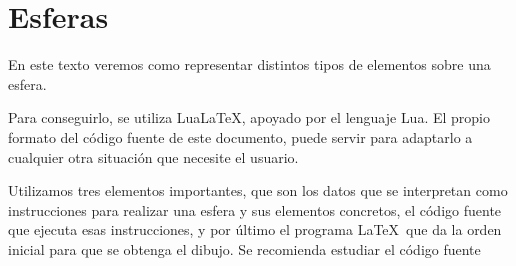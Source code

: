 %

\chapter{Esferas}

En este texto veremos como representar distintos tipos de elementos sobre una esfera.

Para conseguirlo, se utiliza Lua\LaTeX , apoyado por el lenguaje \textsf{Lua}.
El propio formato del código fuente de este documento, puede servir para adaptarlo a
cualquier otra situación que necesite el usuario.

Utilizamos tres elementos importantes, que son los datos que se interpretan como
instrucciones para realizar una esfera y sus elementos concretos, el código fuente que
ejecuta esas instrucciones, y por último el programa \LaTeX\ que da la orden inicial para
que se obtenga el dibujo.   Se recomienda estudiar el código fuente

